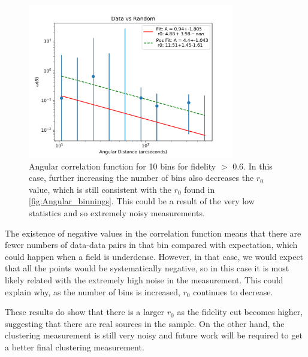 \begin{figure}[!htbp]
\centering \includegraphics[width=90mm]{clustering_two/Data_vs_Random_20000_bin10_sn0_6_NFalse.png}
\caption{Angular correlation function for 10 bins for fidelity $>$ 0.6. In this case, further increasing the number of bins also decreases the $r_0$ value, which is still consistent with the $r_0$ found in \ref{fig:Angular_binnings}. This could be a result of the very low statistics and so extremely noisy measurements.}
\label{fig:Angular_bin_5}
\end{figure}

The existence of negative values in the correlation function means that there are fewer numbers of data-data pairs in that bin compared with expectation, which could happen when a field is underdense. However, in that case, we would expect that all the points would be systematically negative, so in this case it is most likely related with the extremely high noise in the measurement. This could explain why, as the number of bins is increased, $r_0$ continues to decrease. 

These results do show that there is a larger $r_0$ as the fidelity cut becomes higher, suggesting that there are real sources in the sample. On the other hand, the clustering measurement is still very noisy and future work will be required to get a better final clustering measurement.


